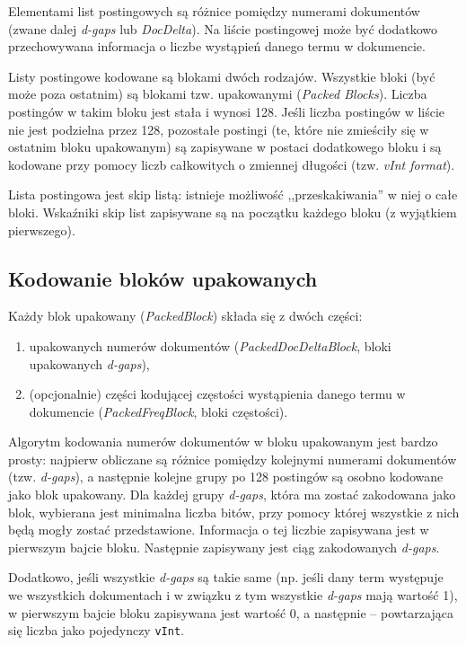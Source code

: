 Elementami list postingowych są różnice pomiędzy numerami dokumentów (zwane dalej \emph{d-gaps} lub \emph{DocDelta}). Na liście postingowej może być dodatkowo przechowywana informacja o liczbe wystąpień danego termu w dokumencie.

Listy postingowe kodowane są blokami dwóch rodzajów. Wszystkie bloki (być może poza ostatnim) są blokami tzw. upakowanymi (\emph{Packed Blocks}). Liczba postingów w takim bloku jest stała i wynosi 128. Jeśli liczba postingów w liście nie jest podzielna przez 128, pozostałe postingi (te, które nie zmieściły się w ostatnim bloku upakowanym) są zapisywane w postaci dodatkowego bloku i są kodowane przy pomocy liczb całkowitych o zmiennej długości (tzw. \emph{vInt format}).

Lista postingowa jest skip listą: istnieje możliwość ,,przeskakiwania'' w niej o całe bloki. Wskaźniki skip list zapisywane są na początku każdego bloku (z wyjątkiem pierwszego).

\subsection{Kodowanie bloków upakowanych}

Każdy blok upakowany (\emph{PackedBlock}) składa się z dwóch części: 
\begin{enumerate}
 \item upakowanych numerów dokumentów (\emph{PackedDocDeltaBlock}, bloki upakowanych \emph{d-gaps}),
 \item (opcjonalnie) części kodującej częstości wystąpienia danego termu w dokumencie (\emph{PackedFreqBlock}, bloki częstości).
\end{enumerate}

Algorytm kodowania numerów dokumentów w bloku upakowanym jest bardzo prosty: najpierw obliczane są różnice pomiędzy kolejnymi numerami dokumentów (tzw. \emph{d-gaps}), a następnie kolejne grupy po 128 postingów są osobno kodowane jako blok upakowany. Dla każdej grupy \emph{d-gaps}, która ma zostać zakodowana jako blok, wybierana jest minimalna liczba bitów, przy pomocy której wszystkie z nich będą mogły zostać przedstawione. Informacja o tej liczbie zapisywana jest w pierwszym bajcie bloku. Następnie zapisywany jest ciąg zakodowanych \emph{d-gaps}.

Dodatkowo, jeśli wszystkie \emph{d-gaps} są takie same (np. jeśli dany term występuje we wszystkich dokumentach i w związku z tym wszystkie \emph{d-gaps} mają wartość 1), w pierwszym bajcie bloku zapisywana jest wartość 0, a następnie -- powtarzająca się liczba jako pojedynczy \texttt{vInt}.

